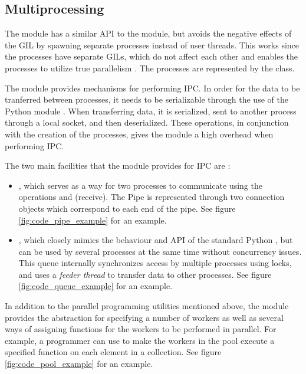 \subsection{Multiprocessing}
The  module has a similar API to the  module, but avoids the negative effects of the GIL by spawning
separate processes instead of user threads. This works since the processes have separate GILs, which do not affect each other and
enables the processes to utilize true parallelism \cite{slatkin_2015_effective_ep5swtwbp}. The processes are represented by the  class.

The  module provides mechanisms for performing IPC.
In order for the data to be tranferred between processes, it needs to be serializable through the use of the Python 
module \cite[p. 143]{slatkin_2015_effective_ep5swtwbp}. When transferring data, it is serialized, sent to another process through
a local socket, and then deserialized. These operations, in conjunction with the creation of the processes, gives the
 module a high overhead when performing IPC.

The two main facilities that the  module provides for IPC are \cite{palach_2014_parallel_ppwp}:
\begin{itemize}
  \item {}, which serves as a way for two processes to communicate using the operations 
    and  (receive). The Pipe is represented through two connection objects which correspond to each end of the pipe.
    See figure \ref{fig:code_pipe_example} for an example.
  \item {}, which closely mimics the behaviour and API of the standard Python , but
    can be used by several processes at the same time without concurrency issues. This  queue internally
    synchronizes access by multiple processes using locks, and uses a \emph{feeder thread} to transfer data to other processes.
    See figure \ref{fig:code_queue_example} for an example.
\end{itemize}

In addition to the parallel programming utilities mentioned above, the  module provides the  abstraction
for specifying a number of workers as well as several ways of assigning functions for the workers to be performed in parallel. For
example, a programmer can use  to make the workers in the pool execute a specified function on each element in a
collection.
See figure \ref{fig:code_pool_example} for an example.

